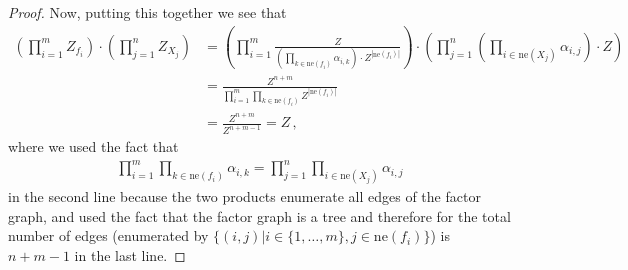 \documentclass[a4paper]{article}
\newcommand{\neighbours}[1]{{\mathrm{ne} \left( {#1} \right)}}
\theoremstyle{definition}
\begin{document}
\begin{proof}
    Now, putting this together we see that 
    \begin{align*}
        \left( \prod_{i=1}^m Z_{f_i} \right) \cdot \left( \prod_{j=1}^n Z_{X_j} \right) 
        & = \left( \prod_{i=1}^m \frac{Z}{\left( \prod_{k \in \neighbours{f_i}} \alpha_{i,k} \right) \cdot Z^{\left| \neighbours{f_i} \right|}} \right) \cdot \left( \prod_{j=1}^n \left( \prod_{i \in \neighbours{X_j}} \alpha_{i,j} \right) \cdot Z \right) \\
        & = \frac{Z^{n+m}}{\prod_{i=1}^m \prod_{k \in \neighbours{f_i}} Z^{\left| \neighbours{f_i} \right|}} \\
        & = \frac{Z^{n+m}}{Z^{n+m-1}} = Z \,,
    \end{align*}
    where we used the fact that 
    \begin{align*}
        \prod_{i=1}^m \prod_{k \in \neighbours{f_i}} \alpha_{i,k} = \prod_{j=1}^n \prod_{i \in \neighbours{X_j}} \alpha_{i,j} 
    \end{align*} 
    in the second line because the two products enumerate all edges of the factor graph, and used the fact that the factor graph is a tree and therefore for the total number of edges (enumerated by $\{ (i,j) | i \in \{1,\ldots,m\}, j \in \neighbours{f_i} \}$) is $n+m-1$ in the last line.
\end{proof}
\end{document}
